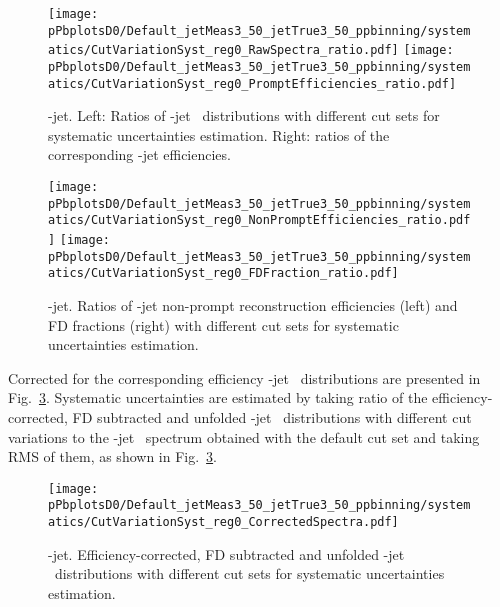 \begin{figure}[bth]
\begin{center}
\texttt{[image: pPbplotsD0/Default\_jetMeas3\_50\_jetTrue3\_50\_ppbinning/systematics/CutVariationSyst\_reg0\_RawSpectra\_ratio.pdf]}
\texttt{[image: pPbplotsD0/Default\_jetMeas3\_50\_jetTrue3\_50\_ppbinning/systematics/CutVariationSyst\_reg0\_PromptEfficiencies\_ratio.pdf]}
\caption{\Dzero-jet. Left: Ratios of \Dzero-jet \pt\ distributions with different cut sets for systematic uncertainties estimation. Right: ratios of the corresponding \Dzero-jet efficiencies.} 
\label{fig:JetPtRawSysRatio_Dzero}
\end{center}
\end{figure}

\begin{figure}[bth]
\begin{center}
\texttt{[image: pPbplotsD0/Default\_jetMeas3\_50\_jetTrue3\_50\_ppbinning/systematics/CutVariationSyst\_reg0\_NonPromptEfficiencies\_ratio.pdf]}
\texttt{[image: pPbplotsD0/Default\_jetMeas3\_50\_jetTrue3\_50\_ppbinning/systematics/CutVariationSyst\_reg0\_FDFraction\_ratio.pdf]}
\caption{\Dzero-jet. Ratios of \Dzero-jet non-prompt reconstruction efficiencies (left) and FD fractions (right) with different cut sets for systematic uncertainties estimation.} 
\label{fig:JetcutVarFD_Dzero}
\end{center}
\end{figure} 

Corrected for the corresponding efficiency \Dzero-jet \ptchjet\ distributions are presented in Fig.~\ref{fig:JetPtSys_Dzero}. Systematic uncertainties are estimated by taking ratio of the efficiency-corrected, FD subtracted and unfolded \Dzero-jet \ptchjet\ distributions with different cut variations to the \Dzero-jet \pt\ spectrum obtained with the default cut set and taking RMS of them, as shown in Fig.~\ref{fig:JetPtSys_Dzero}.

\begin{figure}[bth]
\begin{center}
\texttt{[image: pPbplotsD0/Default\_jetMeas3\_50\_jetTrue3\_50\_ppbinning/systematics/CutVariationSyst\_reg0\_CorrectedSpectra.pdf]}
\caption{\Dzero-jet. Efficiency-corrected, FD subtracted and unfolded \Dzero-jet \pt\ distributions with different cut sets for systematic uncertainties estimation.} 
\label{fig:JetPtSys_Dzero}
\end{center}
\end{figure}

